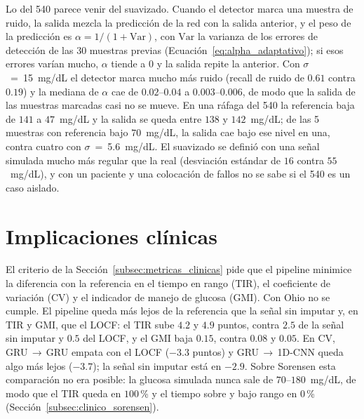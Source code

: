\documentclass{report}
\begin{document}
Lo del 540 parece venir del suavizado. Cuando el detector marca una muestra de ruido, la salida mezcla la predicción de la red con la salida anterior, y el peso de la predicción es $\alpha = 1/(1 + \mathrm{Var})$, con $\mathrm{Var}$ la varianza de los errores de detección de las 30 muestras previas (Ecuación~\ref{eq:alpha_adaptativo}); si esos errores varían mucho, $\alpha$ tiende a 0 y la salida repite la anterior. Con $\sigma$~=~15~mg/dL el detector marca mucho más ruido (recall de ruido de $0.61$ contra $0.19$) y la mediana de $\alpha$ cae de $0.02$--$0.04$ a $0.003$--$0.006$, de modo que la salida de las muestras marcadas casi no se mueve. En una ráfaga del 540 la referencia baja de $141$ a $47$~mg/dL y la salida se queda entre $138$ y $142$~mg/dL; de las 5 muestras con referencia bajo $70$~mg/dL, la salida cae bajo ese nivel en una, contra cuatro con $\sigma$~=~5.6~mg/dL. El suavizado se definió con una señal simulada mucho más regular que la real (desviación estándar de $16$ contra $55$~mg/dL), y con un paciente y una colocación de fallos no se sabe si el 540 es un caso aislado.

\section{Implicaciones clínicas}
\label{sec:disc_clinicas}

El criterio de la Sección~\ref{subsec:metricas_clinicas} pide que el pipeline minimice la diferencia con la referencia en el tiempo en rango (TIR), el coeficiente de variación (CV) y el indicador de manejo de glucosa (GMI). Con Ohio no se cumple. El pipeline queda más lejos de la referencia que la señal sin imputar y, en TIR y GMI, que el LOCF: el TIR sube $4.2$ y $4.9$ puntos, contra $2.5$ de la señal sin imputar y $0.5$ del LOCF, y el GMI baja $0.15$, contra $0.08$ y $0.05$. En CV, GRU\,$\rightarrow$\,GRU empata con el LOCF ($-3.3$ puntos) y GRU\,$\rightarrow$\,1D-CNN queda algo más lejos ($-3.7$); la señal sin imputar está en $-2.9$. Sobre Sorensen esta comparación no era posible: la glucosa simulada nunca sale de $70$--$180$~mg/dL, de modo que el TIR queda en $100$\,\% y el tiempo sobre y bajo rango en $0$\,\% (Sección~\ref{subsec:clinico_sorensen}).
\end{document}
